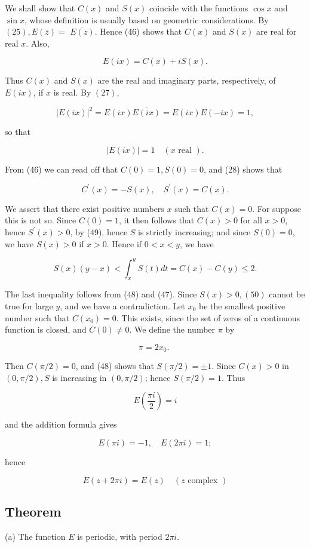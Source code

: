 \documentclass[10pt]{article}
\begin{document}
We shall show that $C(x)$ and $S(x)$ coincide with the functions $\cos x$ and $\sin x$, whose definition is usually based on geometric considerations. By $(25), E(\bar{z})=$ $\overline{E(z)}$. Hence (46) shows that $C(x)$ and $S(x)$ are real for real $x$. Also,

$$
E(i x)=C(x)+i S(x) .
$$

Thus $C(x)$ and $S(x)$ are the real and imaginary parts, respectively, of $E(i x)$, if $x$ is real. By $(27)$,

$$
|E(i x)|^{2}=E(i x) \overline{E(i x)}=E(i x) E(-i x)=1,
$$

so that

$$
|E(i x)|=1 \quad(x \text { real }) .
$$

From (46) we can read off that $C(0)=1, S(0)=0$, and (28) shows that

$$
C^{\prime}(x)=-S(x), \quad S^{\prime}(x)=C(x) .
$$

We assert that there exist positive numbers $x$ such that $C(x)=0$. For suppose this is not so. Since $C(0)=1$, it then follows that $C(x)>0$ for all $x>0$, hence $S^{\prime}(x)>0$, by (49), hence $S$ is strictly increasing; and since $S(0)=0$, we have $S(x)>0$ if $x>0$. Hence if $0<x<y$, we have

$$
S(x)(y-x)<\int_{x}^{y} S(t) d t=C(x)-C(y) \leq 2 .
$$

The last inequality follows from (48) and (47). Since $S(x)>0,(50)$ cannot be true for large $y$, and we have a contradiction. Let $x_{0}$ be the smallest positive number such that $C\left(x_{0}\right)=0$. This exists, since the set of zeros of a continuous function is closed, and $C(0) \neq 0$. We define the number $\pi$ by

$$
\pi=2 x_{0} \text {. }
$$

Then $C(\pi / 2)=0$, and (48) shows that $S(\pi / 2)= \pm 1$. Since $C(x)>0$ in $(0, \pi / 2), S$ is increasing in $(0, \pi / 2)$; hence $S(\pi / 2)=1$. Thus

$$
E\left(\frac{\pi i}{2}\right)=i
$$

and the addition formula gives

$$
E(\pi i)=-1, \quad E(2 \pi i)=1 ;
$$

hence

$$
E(z+2 \pi i)=E(z) \quad(z \text { complex })
$$

\subsection{Theorem}
(a) The function $E$ is periodic, with period $2 \pi i$.
\end{document}
